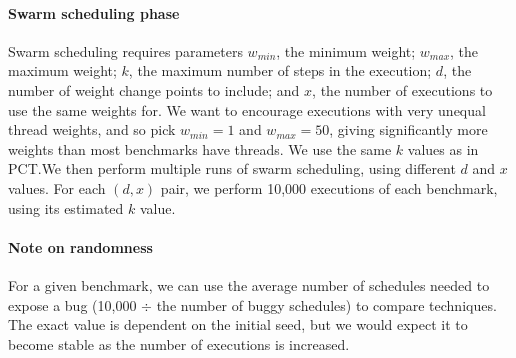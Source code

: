 \paragraph{Swarm scheduling phase}
Swarm scheduling requires parameters $w_{min}$, the minimum weight; $w_{max}$,
the maximum weight; $k$, the maximum number of steps in the execution; $d$, the
number of weight change points to include; and $x$, the number of executions to
use the same weights for.  We want to encourage executions with very unequal
thread weights, and so pick $w_{min}=1$ and $w_{max}=50$, giving significantly
more weights than most benchmarks have threads.  We use the same $k$ values as
in PCT.\@ We then perform multiple runs of swarm scheduling, using different $d$
and $x$ values.  For each $(d, x)$ pair, we perform 10,000 executions of each
benchmark, using its estimated $k$ value.

\paragraph{Note on randomness}
For a given benchmark, we can use the average number of schedules
needed to expose a bug (10,000 $\div$ the number of buggy schedules)
to compare techniques.  The exact value is dependent on the initial
seed, but we would expect it to become stable as the number of
executions is increased\cite{thomson2016}.

